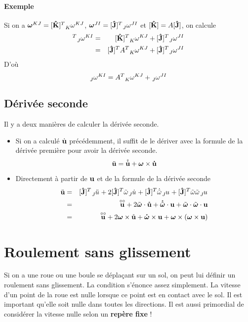 \documentclass[11pt,a4paper]{article}
\newcommand\fv[1]{{\bf #1}} %
\newcommand\fvd[1]{\dot{\bf #1}} %
\newcommand\fvdd[1]{\ddot{\bf #1}} %
\newcommand\fvr[1]{\mathring{\bf #1}} %
\newcommand\fvrr[1]{\overset{\circ\circ}{\bf #1}} %
\newcommand\uj{{\bf\hat{J}}} %
\newcommand\uk{{\bf\hat{K}}} %
\newcommand\wrt[2]{\ensuremath{\tensor*[_{ #1}]{ #2}{}}} %
\newcommand\wtr[3]{\ensuremath{\tensor*[_{ #1}]{ #2}{^{ #3}}}} %
\newcommand\omegaf{{\bm \omega}}
\newcommand\omegafr{\mathring{\bm \omega}}
\newcommand\omegaft{\tilde{\bm \omega}}
\newcommand\omegaftr{\mathring{\tilde{\bm \omega}}}
\newcommand\omegat{\tilde{\omega}}
\begin{document}
\paragraph{Exemple}
Si on a $\omegaf^{KJ} = [\uk]^T \wtr{K}{\omega}{KJ}$, $\omegaf^{JI} = [\uj]^T \wtr{J}{\omega}{JI}$ et $[\uk] = A[\uj]$, on calcule
\begin{eqnarray*}
	[\uj]^T \wtr{J}{\omega}{KI} &=& [\uk]^T \wtr{K}{\omega}{KJ} + [\uj]^T \wtr{J}{\omega}{JI}\\
	&=& [\uj]^T A^T \wtr{K}{\omega}{KJ} + [\uj]^T \wtr{J}{\omega}{JI}
\end{eqnarray*}
D'où
\[ \wtr{J}{\omega}{KI} = A^T \wtr{K}{\omega}{KJ} + \wtr{J}{\omega}{JI} \]

\subsection{Dérivée seconde}
Il y a deux manières de calculer la dérivée seconde.
\begin{itemize}
	\item
		Si on a calculé $\fvd{u}$ précédemment, il suffit de le dériver avec la formule de la dérivée première pour avoir la dérivée seconde.
		\[ \fvdd{u} = \mathring{\fvd{u}} + \omegaf \times \fvd{u} \]
	\item
		Directement à partir de $\fv{u}$ et de la formule de la dérivée seconde
		\begin{eqnarray*}
			\fvdd{u} &=&  [\uj]^T \wrt{J}{\ddot{u}} + 2 [\uj]^T \omegat\wrt{J}{\dot{u}} + [\uj]^T \dot{\omegat}\wrt{J}{u} + [\uj]^T \omegat\omegat\wrt{J}{u}\\
			&=& \fvrr{u} + 2 \omegaft \cdot \fvr{u} + \omegaftr \cdot \fv{u} + \omegaft \cdot \omegaft \cdot \fv{u}\\
			&=& \fvrr{u} + 2 \omegaf \times \fvr{u} + \omegafr \times \fv{u} + \omegaf \times (\omegaf \times \fv{u})
		\end{eqnarray*}
\end{itemize}

\section{Roulement sans glissement}

Si on a une roue ou une boule se déplaçant sur un sol, on peut lui définir un roulement sans glissement.
La condition s'énonce assez simplement.
La vitesse d'un point de la roue est nulle lorsque ce point est en contact avec le sol.
Il est important qu'elle soit nulle dans toutes les directions.
Il est aussi primordial de considérer la vitesse nulle selon un {\bf repère fixe} !
\end{document}
